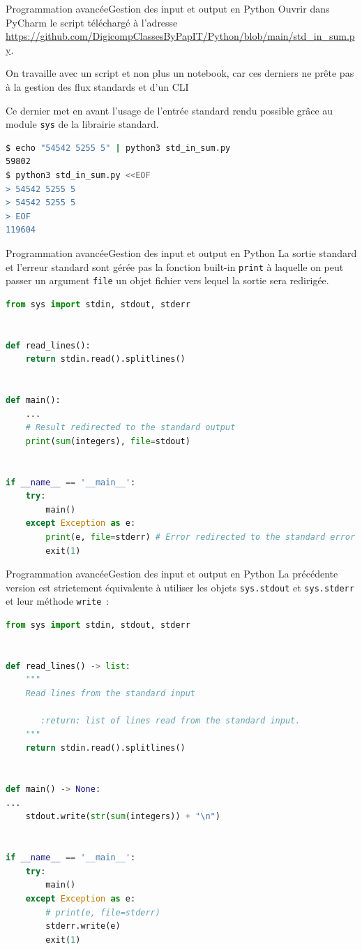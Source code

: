 \documentclass{beamer}
\begin{document}
    \begin{frame}[fragile]{Programmation avancée}{Gestion des input et output en Python}
        Ouvrir dans PyCharm le script téléchargé à l'adresse \url{https://github.com/DigicompClassesByPapIT/Python/blob/main/std_in_sum.py}.
        \begin{dangercolorbox}
            On travaille avec un script et non plus un notebook, car ces derniers ne prête pas à la gestion des flux standards et d'un CLI
        \end{dangercolorbox}
        Ce dernier met en avant l'usage de l'entrée standard rendu possible grâce au module \lstinline{sys} de la librairie standard.
        \begin{lstlisting}[language=bash]
$ echo "54542 5255 5" | python3 std_in_sum.py
59802
$ python3 std_in_sum.py <<EOF
> 54542 5255 5
> 54542 5255 5
> EOF
119604
        \end{lstlisting}
    \end{frame}

    \begin{frame}[fragile]{Programmation avancée}{Gestion des input et output en Python}
        La sortie standard et l'erreur standard sont gérée pas la fonction built-in \lstinline{print} à laquelle on peut passer un argument \lstinline{file} un objet fichier vers lequel la sortie sera redirigée.
        \begin{lstlisting}[language=Python,basicstyle=\tiny\ttfamily]
from sys import stdin, stdout, stderr


def read_lines():
    return stdin.read().splitlines()


def main():
    ...
    # Result redirected to the standard output
    print(sum(integers), file=stdout)


if __name__ == '__main__':
    try:
        main()
    except Exception as e:
        print(e, file=stderr) # Error redirected to the standard error
        exit(1)
        \end{lstlisting}
    \end{frame}

    \begin{frame}[fragile]{Programmation avancée}{Gestion des input et output en Python}
        La précédente version est strictement équivalente à utiliser les objets \lstinline{sys.stdout} et \lstinline{sys.stderr} et leur méthode \lstinline{write}~:
        \begin{lstlisting}[language=Python,basicstyle=\tiny\ttfamily]
from sys import stdin, stdout, stderr


def read_lines() -> list:
    """
    Read lines from the standard input

       :return: list of lines read from the standard input.
    """
    return stdin.read().splitlines()


def main() -> None:
...
    stdout.write(str(sum(integers)) + "\n")


if __name__ == '__main__':
    try:
        main()
    except Exception as e:
        # print(e, file=stderr)
        stderr.write(e)
        exit(1)
        \end{lstlisting}
    \end{frame}
\end{document}
